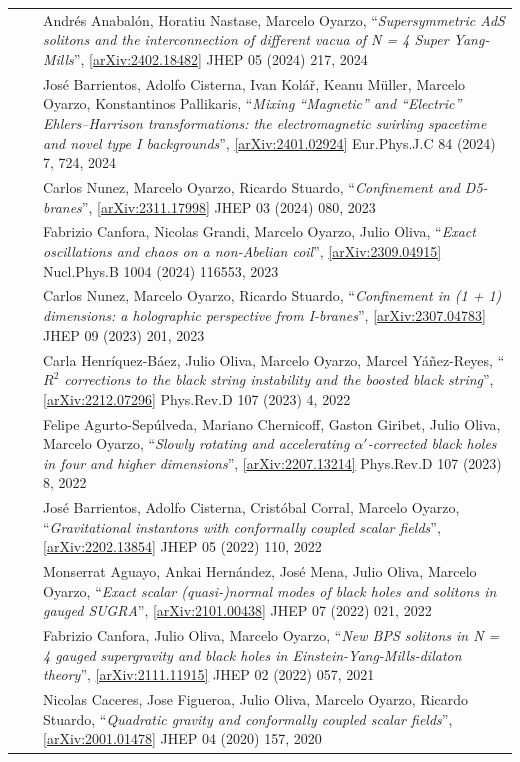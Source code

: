 \documentclass[11pt]{article}
\newenvironment{cvblock}[3]
{
\noindent
\begin{longtable}{p{#1}  >{\raggedright\arraybackslash}p{#2} p{#3}}
}
{
\end{longtable}
}
\newcommand{\cventry}[3]{\textbf{#1} & #2 & #3 \\ }
\newcommand{\paper}[4]{\small #2, “\textit{#1}”, \href{https://arxiv.org/abs/#3}{[arXiv:#3]} #4 \vspace{0.2cm}}
\begin{document}
\begin{cvblock}{1.8cm}{0cm}{13cm}
	\cventry{}{}{\paper{Supersymmetric AdS solitons and the interconnection of different vacua of N = 4 Super Yang-Mills}{Andrés Anabalón, Horatiu Nastase, Marcelo Oyarzo}{2402.18482}{JHEP 05 (2024) 217, 2024}}

	\cventry{}{}{\paper{Mixing “Magnetic” and “Electric” Ehlers–Harrison transformations: the electromagnetic swirling spacetime and novel type I backgrounds}{José Barrientos, Adolfo Cisterna, Ivan Kolář, Keanu Müller, Marcelo Oyarzo, Konstantinos Pallikaris}{2401.02924}{Eur.Phys.J.C 84 (2024) 7, 724, 2024}}

	\cventry{}{}{\paper{Confinement and D5-branes}{Carlos Nunez, Marcelo Oyarzo, Ricardo Stuardo}{2311.17998}{JHEP 03 (2024) 080, 2023}}

	\cventry{}{}{\paper{Exact oscillations and chaos on a non-Abelian coil}{Fabrizio Canfora, Nicolas Grandi, Marcelo Oyarzo, Julio Oliva}{2309.04915}{Nucl.Phys.B 1004 (2024) 116553, 2023}}

	\cventry{}{}{\paper{Confinement in (1 + 1) dimensions: a holographic perspective from I-branes}{Carlos Nunez, Marcelo Oyarzo, Ricardo Stuardo}{2307.04783}{JHEP 09 (2023) 201, 2023}}

	\cventry{}{}{\paper{$R^2$ corrections to the black string instability and the boosted black string}{Carla Henríquez-Báez, Julio Oliva, Marcelo Oyarzo, Marcel Yáñez-Reyes}{2212.07296}{Phys.Rev.D 107 (2023) 4, 2022}}

	\cventry{}{}{\paper{Slowly rotating and accelerating $\alpha'$-corrected black holes in four and higher dimensions}{Felipe Agurto-Sepúlveda, Mariano Chernicoff, Gaston Giribet, Julio Oliva, Marcelo Oyarzo}{2207.13214}{Phys.Rev.D 107 (2023) 8, 2022}}

	\cventry{}{}{\paper{Gravitational instantons with conformally coupled scalar fields}{José Barrientos, Adolfo Cisterna, Cristóbal Corral, Marcelo Oyarzo}{2202.13854}{JHEP 05 (2022) 110, 2022}}

	\cventry{}{}{\paper{Exact scalar (quasi-)normal modes of black holes and solitons in gauged SUGRA}{Monserrat Aguayo, Ankai Hernández, José Mena, Julio Oliva, Marcelo Oyarzo}{2101.00438}{JHEP 07 (2022) 021, 2022}}

	\cventry{}{}{\paper{New BPS solitons in N = 4 gauged supergravity and black holes in Einstein-Yang-Mills-dilaton theory}{Fabrizio Canfora, Julio Oliva, Marcelo Oyarzo}{2111.11915}{JHEP 02 (2022) 057, 2021}}

	\cventry{}{}{\paper{Quadratic gravity and conformally coupled scalar fields}{Nicolas Caceres, Jose Figueroa, Julio Oliva, Marcelo Oyarzo, Ricardo Stuardo}{2001.01478}{JHEP 04 (2020) 157, 2020}}
	

\end{cvblock}
\end{document}
